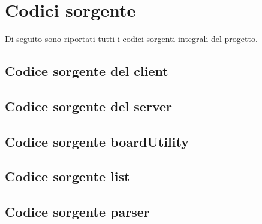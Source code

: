 \documentclass[a4paper]{article}
\begin{document}
\section{Codici sorgente}
Di seguito sono riportati tutti i codici sorgenti integrali del progetto.
\subsection{Codice sorgente del client}

\subsection{Codice sorgente del server}

\subsection{Codice sorgente boardUtility}


\subsection{Codice sorgente list}


\subsection{Codice sorgente parser}


\pagebreak
\lstlistoflistings
\end{document}
